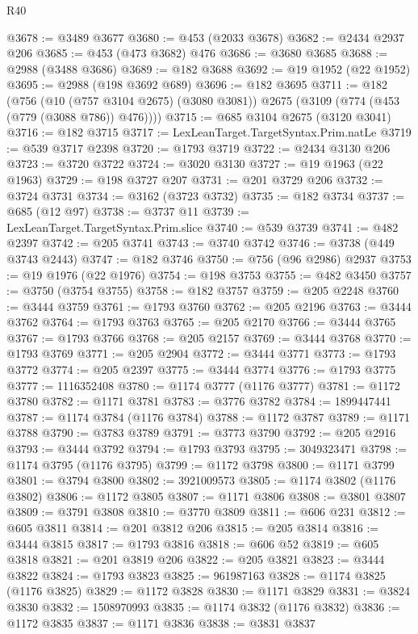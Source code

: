 \begin{lexlean}{R40}
\begin{coremodule}
@3678 := @3489 @3677
@3680 := @453 (@2033 @3678)
@3682 := @2434 @2937 @206
@3685 := @453 (@473 @3682) @476
@3686 := @3680 @3685
@3688 := @2988 (@3488 @3686)
@3689 := @182 @3688
@3692 := @19 @1952 (@22 @1952)
@3695 := @2988 (@198 @3692 @689)
@3696 := @182 @3695
@3711 := @182
    (@756
      (@10 (@757 @3104 @2675) (@3080 @3081))
      @2675
      (@3109 (@774 (@453 (@779 (@3088 @786)) @476))))
@3715 := @685 @3104 @2675 (@3120 @3041)
@3716 := @182 @3715
@3717 := LexLeanTarget.TargetSyntax.Prim.natLe
@3719 := @539 @3717 @2398
@3720 := @1793 @3719
@3722 := @2434 @3130 @206
@3723 := @3720 @3722
@3724 := @3020 @3130
@3727 := @19 @1963 (@22 @1963)
@3729 := @198 @3727 @207
@3731 := @201 @3729 @206
@3732 := @3724 @3731
@3734 := @3162 (@3723 @3732)
@3735 := @182 @3734
@3737 := @685 (@12 @97)
@3738 := @3737 @11
@3739 := LexLeanTarget.TargetSyntax.Prim.slice
@3740 := @539 @3739
@3741 := @482 @2397
@3742 := @205 @3741
@3743 := @3740 @3742
@3746 := @3738 (@449 @3743 @2443)
@3747 := @182 @3746
@3750 := @756 (@96 @2986) @2937
@3753 := @19 @1976 (@22 @1976)
@3754 := @198 @3753
@3755 := @482 @3450
@3757 := @3750 (@3754 @3755)
@3758 := @182 @3757
@3759 := @205 @2248
@3760 := @3444 @3759
@3761 := @1793 @3760
@3762 := @205 @2196
@3763 := @3444 @3762
@3764 := @1793 @3763
@3765 := @205 @2170
@3766 := @3444 @3765
@3767 := @1793 @3766
@3768 := @205 @2157
@3769 := @3444 @3768
@3770 := @1793 @3769
@3771 := @205 @2904
@3772 := @3444 @3771
@3773 := @1793 @3772
@3774 := @205 @2397
@3775 := @3444 @3774
@3776 := @1793 @3775
@3777 := 1116352408
@3780 := @1174 @3777 (@1176 @3777)
@3781 := @1172 @3780
@3782 := @1171 @3781
@3783 := @3776 @3782
@3784 := 1899447441
@3787 := @1174 @3784 (@1176 @3784)
@3788 := @1172 @3787
@3789 := @1171 @3788
@3790 := @3783 @3789
@3791 := @3773 @3790
@3792 := @205 @2916
@3793 := @3444 @3792
@3794 := @1793 @3793
@3795 := 3049323471
@3798 := @1174 @3795 (@1176 @3795)
@3799 := @1172 @3798
@3800 := @1171 @3799
@3801 := @3794 @3800
@3802 := 3921009573
@3805 := @1174 @3802 (@1176 @3802)
@3806 := @1172 @3805
@3807 := @1171 @3806
@3808 := @3801 @3807
@3809 := @3791 @3808
@3810 := @3770 @3809
@3811 := @606 @231
@3812 := @605 @3811
@3814 := @201 @3812 @206
@3815 := @205 @3814
@3816 := @3444 @3815
@3817 := @1793 @3816
@3818 := @606 @52
@3819 := @605 @3818
@3821 := @201 @3819 @206
@3822 := @205 @3821
@3823 := @3444 @3822
@3824 := @1793 @3823
@3825 := 961987163
@3828 := @1174 @3825 (@1176 @3825)
@3829 := @1172 @3828
@3830 := @1171 @3829
@3831 := @3824 @3830
@3832 := 1508970993
@3835 := @1174 @3832 (@1176 @3832)
@3836 := @1172 @3835
@3837 := @1171 @3836
@3838 := @3831 @3837

\end{coremodule}
\end{lexlean}
